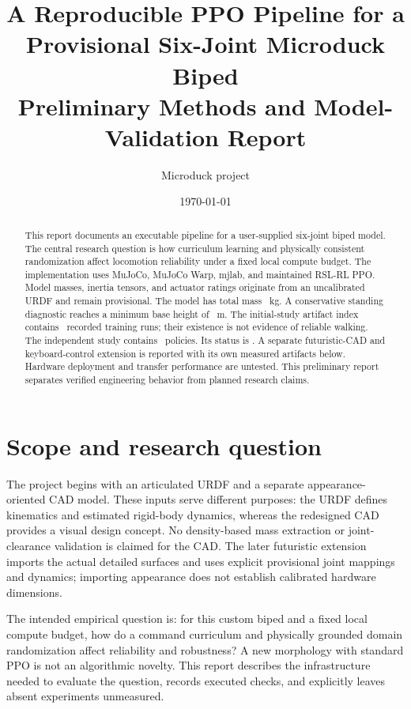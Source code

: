 \documentclass[11pt]{article}
\title{A Reproducible PPO Pipeline for a Provisional Six-Joint Microduck Biped\\\large Preliminary Methods and Model-Validation Report}
\author{Microduck project}
\date{\today}
\begin{document}
\maketitle
\begin{abstract}
This report documents an executable pipeline for a user-supplied six-joint biped model. The central research question is how curriculum learning and physically consistent randomization affect locomotion reliability under a fixed local compute budget. The implementation uses MuJoCo, MuJoCo Warp, mjlab, and maintained RSL-RL PPO. Model masses, inertia tensors, and actuator ratings originate from an uncalibrated URDF and remain provisional. The model has total mass \RobotMass\ kg. A conservative standing diagnostic reaches a minimum base height of \StandingHeight\ m. The initial-study artifact index contains \CompletedRuns\ recorded training runs; their existence is not evidence of reliable walking. The independent study contains \StudyRuns\ policies. Its status is \StudyStatus. A separate futuristic-CAD and keyboard-control extension is reported with its own measured artifacts below. Hardware deployment and transfer performance are untested. This preliminary report separates verified engineering behavior from planned research claims.
\end{abstract}

\section{Scope and research question}
The project begins with an articulated URDF and a separate appearance-oriented CAD model. These inputs serve different purposes: the URDF defines kinematics and estimated rigid-body dynamics, whereas the redesigned CAD provides a visual design concept. No density-based mass extraction or joint-clearance validation is claimed for the CAD. The later futuristic extension imports the actual detailed surfaces and uses explicit provisional joint mappings and dynamics; importing appearance does not establish calibrated hardware dimensions.

The intended empirical question is: for this custom biped and a fixed local compute budget, how do a command curriculum and physically grounded domain randomization affect reliability and robustness? A new morphology with standard PPO is not an algorithmic novelty. This report describes the infrastructure needed to evaluate the question, records executed checks, and explicitly leaves absent experiments unmeasured.
\end{document}
